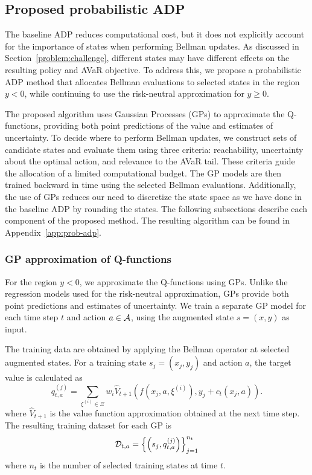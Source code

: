 \subsection{Proposed probabilistic ADP}
\label{method:prob}

The baseline ADP reduces computational cost, but it does not explicitly account for the importance of states when performing Bellman updates. As discussed in Section~\ref{problem:challenge}, different states may have different effects on the resulting policy and AVaR objective. To address this, we propose a probabilistic ADP method that allocates Bellman evaluations to selected states in the region $y<0$, while continuing to use the risk-neutral approximation for $y\geq 0$.

The proposed algorithm uses Gaussian Processes (GPs) to approximate the Q-functions, providing both point predictions of the value and estimates of uncertainty. To decide where to perform Bellman updates, we construct sets of candidate states and evaluate them using three criteria: reachability, uncertainty about the optimal action, and relevance to the AVaR tail. These criteria guide the allocation of a limited computational budget. The GP models are then trained backward in time using the selected Bellman evaluations. Additionally, the use of GPs reduces our need to discretize the state space as we have done in the baseline ADP by rounding the states. The following subsections describe each component of the proposed method. The resulting algorithm can be found in Appendix~\ref{app:prob-adp}.

\subsubsection{GP approximation of Q-functions}
\label{method:gp-approx}

For the region $y<0$, we approximate the Q-functions using GPs. Unlike the regression models used for the risk-neutral approximation, GPs provide both point predictions and estimates of uncertainty. We train a separate GP model for each time step $t$ and action $a \in \mathcal{A}$, using the augmented state $s = (x,y)$ as input.

The training data are obtained by applying the Bellman operator at selected augmented states. For a training state $s_j=(x_j,y_j)$ and action $a$, the target value is calculated as
\begin{equation}
	q_{t,a}^{(j)}
	=
	\sum_{\xi^{(i)}\in\Xi} w_i
	\hat{V}_{t+1}\left(
	f(x_j,a,\xi^{(i)}),
	y_j+c_t(x_j,a)
	\right).
	\label{gp-bellman-target}
\end{equation}
where $\hat{V}_{t+1}$ is the value function approximation obtained at the next time step. The resulting training dataset for each GP is
\begin{equation}
	\mathcal{D}_{t, a} = \left\{ \left( s_j, q_{t, a}^{(j)} \right) \right\}_{j=1}^{n_t}
	\notag
	\label{gp-training-dataset}
\end{equation}
where $n_t$ is the number of selected training states at time $t$.



